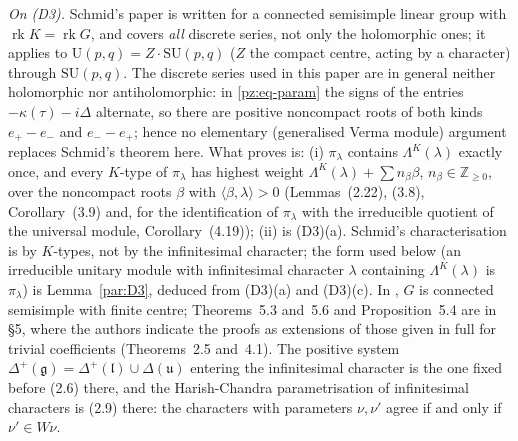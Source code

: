 \documentclass[10pt]{amsart}
\theoremstyle{definition}
\theoremstyle{remark}
\newcommand{\Z}{\mathbb Z}
\providecommand{\auU}{\mathrm U}
\begin{document}
\emph{On (D3).} Schmid's paper is written for a connected semisimple linear group with $\operatorname{rk}K=\operatorname{rk}G$, and covers \emph{all} discrete series, not only the holomorphic ones; it applies to $\auU(p,q)=Z\cdot\mathrm{SU}(p,q)$ ($Z$ the compact centre, acting by a character) through $\mathrm{SU}(p,q)$. The discrete series used in this paper are in general neither holomorphic nor antiholomorphic: in \eqref{pz:eq-param} the signs of the entries $-\kappa(\tau)-i\Delta$ alternate, so there are positive noncompact roots of both kinds $e_+-e_-$ and $e_--e_+$; hence no elementary (generalised Verma module) argument replaces Schmid's theorem here. What \cite{Schmid75} proves is: (i) $\pi_\lambda$ contains $\Lambda^K(\lambda)$ exactly once, and every $K$-type of $\pi_\lambda$ has highest weight $\Lambda^K(\lambda)+\sum n_\beta\beta$, $n_\beta\in\Z_{\ge0}$, over the noncompact roots $\beta$ with $\langle\beta,\lambda\rangle>0$ (Lemmas~(2.22), (3.8), Corollary~(3.9) and, for the identification of $\pi_\lambda$ with the irreducible quotient of the universal module, Corollary~(4.19)); (ii) is (D3)(a). Schmid's characterisation is by $K$-types, not by the infinitesimal character; the form used below (an irreducible unitary module with infinitesimal character $\lambda$ containing $\Lambda^K(\lambda)$ is $\pi_\lambda$) is Lemma~\ref{par:D3}, deduced from (D3)(a) and (D3)(c). In \cite{VoganZuckerman}, $G$ is connected semisimple with finite centre; Theorems~5.3 and~5.6 and Proposition~5.4 are in \S5, where the authors indicate the proofs as extensions of those given in full for trivial coefficients (Theorems~2.5 and~4.1). The positive system $\Delta^+(\mathfrak g)=\Delta^+(\mathfrak l)\cup\Delta(\mathfrak u)$ entering the infinitesimal character is the one fixed before (2.6) there, and the Harish-Chandra parametrisation of infinitesimal characters is (2.9) there: the characters with parameters $\nu,\nu'$ agree if and only if $\nu'\in W\nu$.
\end{document}

